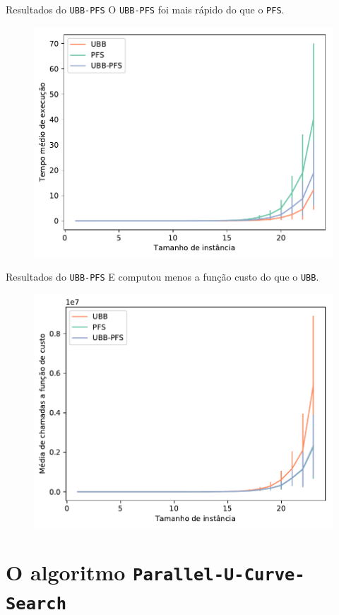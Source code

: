 \documentclass{beamer}
\newcommand{\algname}[1]{\texttt{#1}}
\begin{document}
\begin{frame}{Resultados do \algname{UBB-PFS}}
O \algname{UBB-PFS} foi mais rápido do que o \algname{PFS}.
\pause
\begin{figure}[ht]
\includegraphics[clip=true, width=.7\textwidth]{pfs/ubb-pfs_avg_time.pdf}
\end{figure}
\end{frame}


\begin{frame}{Resultados do \algname{UBB-PFS}}
E computou menos a função custo do que o \algname{UBB}.
\begin{figure}[ht]
\includegraphics[clip=true, width=.7\textwidth]{pfs/ubb-pfs_avg_calls.pdf}
\end{figure}
\end{frame}


\section{O algoritmo \algname{Parallel-U-Curve-Search}}
\end{document}
